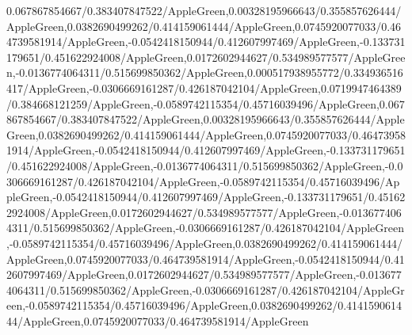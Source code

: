{\begin{tikzternal}
{0.067867854667/0.383407847522/AppleGreen,0.00328195966643/0.355857626444/AppleGreen,0.0382690499262/0.414159061444/AppleGreen,0.0745920077033/0.464739581914/AppleGreen,-0.0542418150944/0.412607997469/AppleGreen,-0.133731179651/0.451622924008/AppleGreen,0.0172602944627/0.534989577577/AppleGreen,-0.0136774064311/0.515699850362/AppleGreen,0.000517938955772/0.334936516417/AppleGreen,-0.0306669161287/0.426187042104/AppleGreen,0.0719947464389/0.384668121259/AppleGreen,-0.0589742115354/0.45716039496/AppleGreen,0.067867854667/0.383407847522/AppleGreen,0.00328195966643/0.355857626444/AppleGreen,0.0382690499262/0.414159061444/AppleGreen,0.0745920077033/0.464739581914/AppleGreen,-0.0542418150944/0.412607997469/AppleGreen,-0.133731179651/0.451622924008/AppleGreen,-0.0136774064311/0.515699850362/AppleGreen,-0.0306669161287/0.426187042104/AppleGreen,-0.0589742115354/0.45716039496/AppleGreen,-0.0542418150944/0.412607997469/AppleGreen,-0.133731179651/0.451622924008/AppleGreen,0.0172602944627/0.534989577577/AppleGreen,-0.0136774064311/0.515699850362/AppleGreen,-0.0306669161287/0.426187042104/AppleGreen,-0.0589742115354/0.45716039496/AppleGreen,0.0382690499262/0.414159061444/AppleGreen,0.0745920077033/0.464739581914/AppleGreen,-0.0542418150944/0.412607997469/AppleGreen,0.0172602944627/0.534989577577/AppleGreen,-0.0136774064311/0.515699850362/AppleGreen,-0.0306669161287/0.426187042104/AppleGreen,-0.0589742115354/0.45716039496/AppleGreen,0.0382690499262/0.414159061444/AppleGreen,0.0745920077033/0.464739581914/AppleGreen} {
 \DATACIRCLE[\c]{(\x,\y)}
}
\end{tikzternal}
}